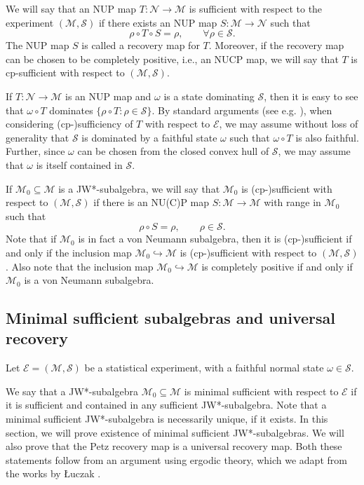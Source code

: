\documentclass[12pt]{article}
\def\Ne{\mathcal N}
\def\Me{\mathcal M}
\def\Ee{\mathcal E}
\def\Se{\mathcal S}
\theoremstyle{definition}
\theoremstyle{remark}
\begin{document}
We will say that an NUP map $T:\Ne\to \Me$ is sufficient with respect to the experiment
$(\Me,\Se)$ if there exists an NUP map $S:\Me\to\Ne$ such that 
\[
\rho\circ T\circ S=\rho,\qquad \forall \rho\in \Se.
\]
The NUP map $S$ is called a recovery map for $T$. Moreover, if the recovery map can be chosen to be completely positive, i.e., an NUCP map, we will say that $T$ is cp-sufficient with respect to $(\Me,\Se)$.

If $T:\Ne\to \Me$ is an NUP map and $\omega$ is a state dominating $\Se$, then it is easy
to see that $\omega\circ T$ dominates
$\{\rho\circ T\colon \rho\in \Se\}$. By standard arguments (see e.g.
\cite{luijk2026sufficiency}), when considering (cp-)sufficiency of $T$ with respect to
$\Ee$, we may assume without loss of generality that $\Se$ is dominated by a faithful
state  $\omega$ such that  $\omega\circ T$ is also faithful. 
Further, since $\omega$
can be chosen from the closed convex hull of $\Se$, we may assume that $\omega$ is itself
contained in $\Se$.


If $\Me_0\subseteq \Me$ is a JW*-subalgebra, we will say that $\Me_0$ is (cp-)sufficient with
respect to $(\Me,\Se)$ if there is an NU(C)P map $S:\Me\to \Me$ with range in $\Me_0$
such that 
\[
\rho\circ S=\rho,\qquad \rho\in \Se.
\]
Note that if $\Me_0$ is in fact a von Neumann subalgebra, then it is (cp-)sufficient if and only if 
the inclusion map $\Me_0\hookrightarrow \Me$ is (cp-)sufficient with respect to
$(\Me,\Se)$. 
Also note that the inclusion map $\Me_0\hookrightarrow \Me$ is completely positive if and only if $\Me_0$ is a von Neumann subalgebra.


\subsection{Minimal sufficient subalgebras and universal recovery}

Let $\Ee=(\Me,\Se)$ be a statistical experiment, with a faithful normal state $\omega\in
\Se$. 

We say that a JW*-subalgebra  $\Me_0\subseteq \Me$ is minimal sufficient
with respect to $\Ee$ 
if it is sufficient and contained in any sufficient JW*-subalgebra. Note that a
minimal sufficient JW*-subalgebra is necessarily unique, if it exists.
In this section, we will prove existence of minimal sufficient JW*-subalgebras. We will also prove that the Petz recovery map is a universal recovery map. 
Both these statements follow from an argument using ergodic theory, which we adapt from
the works by \L uczak \cite{luczak2014quantum,luczak2021some}.
\end{document}
